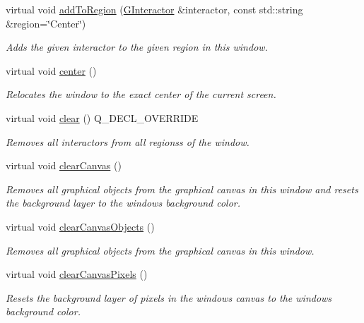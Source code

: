 \begin{DoxyCompactItemize}
virtual void \mbox{\hyperlink{classGWindow_a667ed0065e0bbb52a893904e7f2383bb}{add\+To\+Region}} (\mbox{\hyperlink{classGInteractor}{G\+Interactor}} \&interactor, const std\+::string \&region=\char`\"{}Center\char`\"{})
\begin{DoxyCompactList}\small\item\em Adds the given interactor to the given region in this window. \end{DoxyCompactList}\item 
virtual void \mbox{\hyperlink{classGWindow_a5013a22e5b1f902226b7394353f884ff}{center}} ()
\begin{DoxyCompactList}\small\item\em Relocates the window to the exact center of the current screen. \end{DoxyCompactList}\item 
virtual void \mbox{\hyperlink{classGWindow_af220cadd1499c3586d48010a0348d9f8}{clear}} () Q\+\_\+\+D\+E\+C\+L\+\_\+\+O\+V\+E\+R\+R\+I\+DE
\begin{DoxyCompactList}\small\item\em Removes all interactors from all regionss of the window. \end{DoxyCompactList}\item 
virtual void \mbox{\hyperlink{classGWindow_a8c64b6dc10f111538780ddca425a1693}{clear\+Canvas}} ()
\begin{DoxyCompactList}\small\item\em Removes all graphical objects from the graphical canvas in this window and resets the background layer to the window\textquotesingle{}s background color. \end{DoxyCompactList}\item 
virtual void \mbox{\hyperlink{classGWindow_a7d6e3e87568ed9962d29a0c9337c4b87}{clear\+Canvas\+Objects}} ()
\begin{DoxyCompactList}\small\item\em Removes all graphical objects from the graphical canvas in this window. \end{DoxyCompactList}\item 
virtual void \mbox{\hyperlink{classGWindow_a0c30950304fa997055183be1d212a262}{clear\+Canvas\+Pixels}} ()
\begin{DoxyCompactList}\small\item\em Resets the background layer of pixels in the window\textquotesingle{}s canvas to the window\textquotesingle{}s background color. \end{DoxyCompactList}\item 

\end{DoxyCompactItemize}
